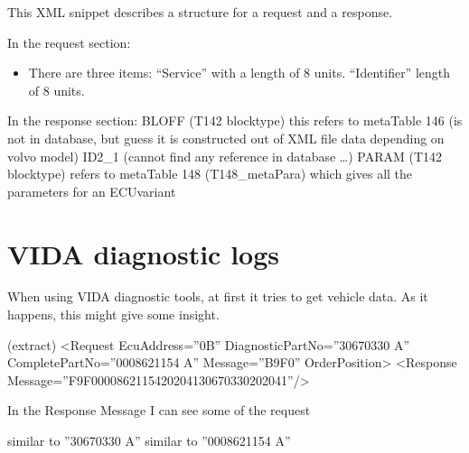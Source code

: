 \documentclass[letterpaper,10pt,english]{sphinxmanual}
\begin{document}
\sphinxAtStartPar
This XML snippet describes a structure for a request and a response.

\sphinxAtStartPar
In the request section:
\begin{itemize}
\item {} 
\sphinxAtStartPar
There are three items:
\sphinxhyphen{} “Service” with a length of 8 units.
\sphinxhyphen{} “Identifier” length of 8 units.

\end{itemize}

\sphinxAtStartPar
In the response section:
\sphinxhyphen{} BLOFF (T142 blocktype) this refers to metaTable 146 (is not in database, but guess it is constructed out of XML file data depending on volvo model)
\sphinxhyphen{} ID2\_1 (cannot find any reference in database …)
\sphinxhyphen{} PARAM (T142 blocktype) refers to metaTable 148 (T148\_metaPara) which gives all the parameters for an ECUvariant


\section{VIDA diagnostic logs}
\label{\detokenize{makingsense/respons:vida-diagnostic-logs}}
\sphinxAtStartPar
When using VIDA diagnostic tools, at first it tries to get vehicle data.
As it happens, this might give some insight.

\sphinxAtStartPar
(extract)
\textless{}Request EcuAddress=”0B” DiagnosticPartNo=”30670330 A” CompletePartNo=”0008621154 A” Message=”B9F0” OrderPosition\textgreater{}
\textless{}Response Message=”F9F0000862115420204130670330202041”/\textgreater{}

\sphinxAtStartPar
In the Response Message I can see some of the request

\sphinxAtStartPar
{} similar to ”30670330 A”
 similar to ”0008621154 A”
\end{document}
